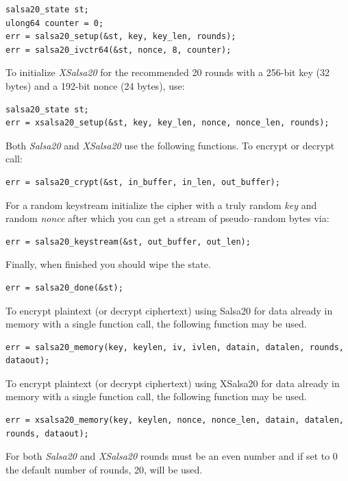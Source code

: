 \documentclass[synpaper]{book}
\begin{document}
\begin{verbatim}
salsa20_state st;
ulong64 counter = 0;
err = salsa20_setup(&st, key, key_len, rounds);
err = salsa20_ivctr64(&st, nonce, 8, counter);
\end{verbatim}

To initialize \textit{XSalsa20} for the recommended 20 rounds with a 256-bit
key (32 bytes) and a 192-bit nonce (24 bytes), use:

\begin{verbatim}
salsa20_state st;
err = xsalsa20_setup(&st, key, key_len, nonce, nonce_len, rounds);
\end{verbatim}

Both \textit{Salsa20} and \textit{XSalsa20} use the following functions.  To
encrypt or decrypt call:
\begin{verbatim}
err = salsa20_crypt(&st, in_buffer, in_len, out_buffer);
\end{verbatim}

For a random keystream initialize the cipher with a truly random \textit{key}
and random \textit{nonce} after which you can get a stream of
pseudo--random bytes via:
\begin{verbatim}
err = salsa20_keystream(&st, out_buffer, out_len);
\end{verbatim}

Finally, when finished you should wipe the state.
\begin{verbatim}
err = salsa20_done(&st);
\end{verbatim}

To encrypt plaintext (or decrypt ciphertext) using Salsa20 for data already in
memory with a single function call, the following function may be used.
\begin{verbatim}
err = salsa20_memory(key, keylen, iv, ivlen, datain, datalen, rounds, dataout);
\end{verbatim}

To encrypt plaintext (or decrypt ciphertext) using XSalsa20 for data already in
memory with a single function call, the following function may be used.
\begin{verbatim}
err = xsalsa20_memory(key, keylen, nonce, nonce_len, datain, datalen, rounds, dataout);
\end{verbatim}

For both \textit{Salsa20} and \textit{XSalsa20} rounds must be an even number
and if set to 0 the default number of rounds, 20, will be used.
\vspace{1mm}
\end{document}
